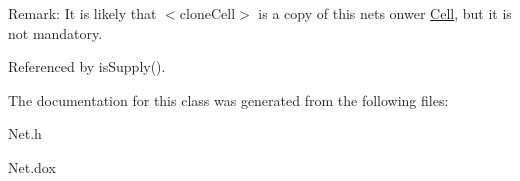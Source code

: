\begin{DoxyParagraph}{Remark\+:}
It is likely that {\ttfamily } $<$clone\+Cell$>$ is a copy of this net\textquotesingle{}s onwer \hyperlink{classHurricane_1_1Cell}{Cell}, but it is not mandatory. 
\end{DoxyParagraph}


Referenced by is\+Supply().



The documentation for this class was generated from the following files\+:\begin{DoxyCompactItemize}
\item 
Net.\+h\item 
Net.\+dox\end{DoxyCompactItemize}
